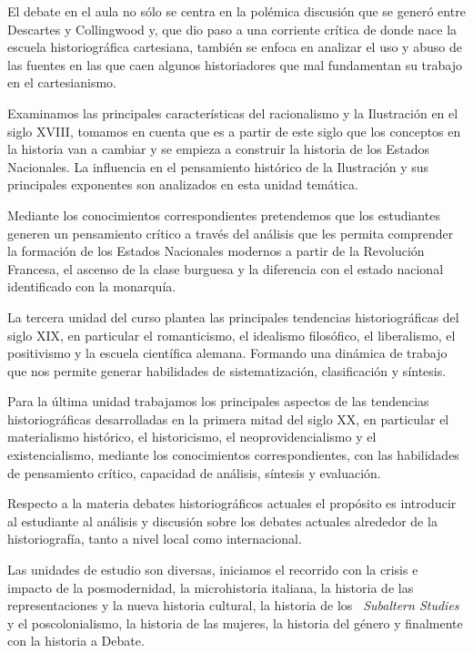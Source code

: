 El debate en el aula no sólo se centra en la polémica discusión que se 
generó entre Descartes y Collingwood y, que dio paso a una corriente 
crítica de donde nace la escuela historiográfica cartesiana, también se 
enfoca en analizar el uso y abuso de las fuentes en las que caen 
algunos historiadores que mal fundamentan su trabajo en el 
cartesianismo.

Examinamos las principales características del racionalismo y la 
Ilustración en el siglo XVIII, tomamos en cuenta que es a partir de 
este siglo que los conceptos en la historia van a cambiar y se empieza 
a construir la historia de los Estados Nacionales. La influencia en el 
pensamiento histórico de la Ilustración y sus principales exponentes 
son analizados en esta unidad temática. 

Mediante los conocimientos correspondientes pretendemos que los 
estudiantes generen un pensamiento crítico a través del análisis que 
les permita comprender la formación de los Estados Nacionales modernos 
a partir de la Revolución Francesa, el ascenso de la clase burguesa y 
la diferencia con el estado nacional identificado con la monarquía.
 
La tercera unidad del curso plantea las principales tendencias 
historiográficas del siglo XIX, en particular el romanticismo, el 
idealismo filosófico, el liberalismo, el positivismo y la escuela 
científica alemana. Formando una dinámica de trabajo que nos permite 
generar habilidades de sistematización, clasificación y síntesis.

Para la última unidad trabajamos los principales aspectos de las 
tendencias historiográficas desarrolladas en la primera mitad del siglo 
XX, en particular el materialismo histórico, el historicismo, el 
neoprovidencialismo y el existencialismo, mediante los conocimientos 
correspondientes, con las habilidades de pensamiento crítico, capacidad 
de análisis, síntesis y evaluación.

Respecto a la materia debates historiográficos actuales el propósito es 
introducir al estudiante al análisis y discusión sobre los debates 
actuales alrededor de la historiografía, tanto a nivel local como 
internacional.

Las unidades de estudio son diversas, iniciamos el recorrido con la 
crisis e impacto de la posmodernidad, la microhistoria italiana, la
historia de las representaciones y la nueva historia cultural, la historia 
de los {\itshape\ Subaltern Studies\/} y el poscolonialismo, la historia de las mujeres, 
la historia del género y finalmente con la historia a Debate.

